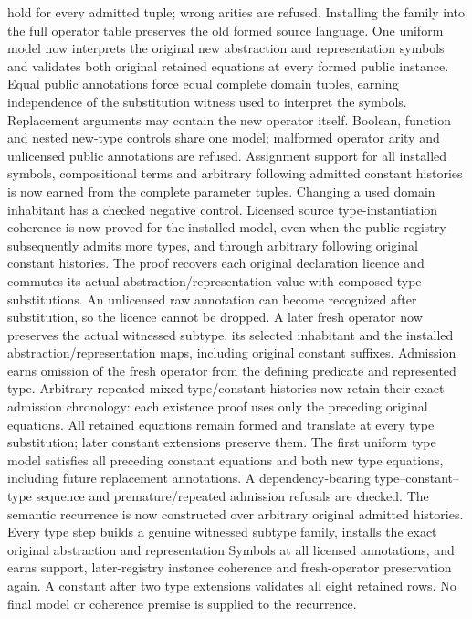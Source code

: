 \documentclass[11pt]{article}
\begin{document}
hold for every admitted tuple; wrong arities are refused. Installing the
family into the full operator table preserves the old formed source
language. One uniform model now interprets the original new abstraction
and representation symbols and validates both original retained equations
at every formed public instance. Equal public annotations force equal
complete domain tuples, earning independence of the substitution witness
used to interpret the symbols. Replacement arguments may contain the new
operator itself. Boolean, function and nested new-type controls share one
model; malformed operator arity and unlicensed public annotations are
refused. Assignment support for all installed symbols, compositional terms
and arbitrary following admitted constant histories is now earned from the
complete parameter tuples. Changing a used domain inhabitant has a checked
negative control. Licensed source type-instantiation coherence is now
proved for the installed model, even when the public registry subsequently
admits more types, and through arbitrary following original constant
histories. The proof recovers each original declaration licence and
commutes its actual abstraction/representation value with composed type
substitutions. An unlicensed raw annotation can become recognized after
substitution, so the licence cannot be dropped. A later fresh operator now preserves the actual witnessed subtype,
its selected inhabitant and the installed abstraction/representation maps,
including original constant suffixes. Admission earns omission of the fresh
operator from the defining predicate and represented type. Arbitrary repeated
mixed type/constant histories now retain their exact admission chronology:
each existence proof uses only the preceding original equations. All
retained equations remain formed and translate at every type substitution;
later constant extensions preserve them. The first uniform type model
satisfies all preceding constant equations and both new type equations,
including future replacement annotations. A dependency-bearing
type--constant--type sequence and premature/repeated admission refusals
are checked. The semantic recurrence is now constructed over arbitrary
original admitted histories. Every type step builds a genuine witnessed
subtype family, installs the exact original abstraction and representation
Symbols at all licensed annotations, and earns support, later-registry
instance coherence and fresh-operator preservation again. A constant after
two type extensions validates all eight retained rows. No final model or
coherence premise is supplied to the recurrence.
\end{document}

